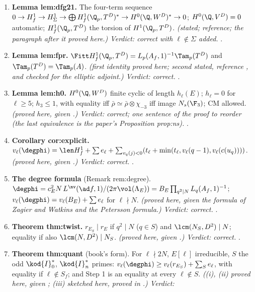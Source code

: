 \begin{sloppypar}
\begin{enumerate}[label=\textbf{\thechapter.\arabic*}]
\emph{(stated; reference; they cover $\ell=3$.)} .
\item \textbf{Lemma lem:dfg21.} The four-term sequence $0\to H^1_f\to H^1_\Sigma\to\bigoplus H^1_f(\Q_p,T^D)^*\to H^0(\Q,W^D)^*\to0$; $H^0(\Q,V^D)=0$ automatic; $H^1_f(\Q_p,T^D)$ the torsion of $H^1(\Q_p,T^D)$.
\emph{(stated; reference; the paragraph after it proved here.) Verdict: correct with $\ell\notin\Sigma$ added.} .
\item \textbf{Lemma lem:fpr.} $\Fitt H^1_f(\Q_p,T^D)=L_p(A_f,1)^{-1}\Tam_p(T^D)$ and $\Tam_p(T^D)=\Tam_p(A)$. \emph{(first identity proved here; second stated, reference \cite[(57)]{DFG04}, and checked for the
elliptic adjoint.) Verdict: correct.} .
\item \textbf{Lemma lem:h0.} $H^0(\Q,W^D)$ finite cyclic of length $h_\ell(E)$; $h_\ell=0$ for $\ell\ge5$; $h_3\le1$, with equality iff $\bar\rho\simeq\bar\rho\otimes\chi_{-3}$ iff image $N_s(\F_3)$; CM allowed.
\emph{(proved here, given .) Verdict: correct; one sentence of the proof to reorder (the last equivalence is the paper's Proposition prop:ns).} .
\item \textbf{Corollary cor:explicit.} $v_\ell(\degphi)=\len H^1_f+\sum e_\ell+\sum_{v_q(j)<0}(t_\ell+\min(t_\ell,v_\ell(q-1),v_\ell(c(u_q))))$. \emph{(proved here, given .) Verdict: correct.}
.
\item \textbf{The degree formula} (Remark rem:degree). $\degphi=c_E^2N\,L^{\nv}(\ad f,1)/(2\pi\vol(\Lambda_E))=B_E\prod_{q^2\mid N}L_q(A_f,1)^{-1}$; $v_\ell(\degphi)=v_\ell(B_E)+\sum e_\ell$ for $\ell\nmid N$.
\emph{(proved here, given the formula of Zagier and Watkins and the Petersson formula.) Verdict: correct.} .
\item \textbf{Theorem thm:twist.} $r_{E_S}\mid r_E$ if $q^2\mid N$ ($q\in S$) and $\lcm(N_S,D^2)\mid N$; equality if also $\lcm(N,D^2)\mid N_S$. \emph{(proved here, given .) Verdict: correct.}
.
\item \textbf{Theorem thm:quant} (book's form). For $\ell\nmid2N$, $E[\ell]$ irreducible, $S$ the odd $\kod{I}_0^*$, $\kod{I}_n^*$ primes: $v_\ell(\degphi)\ge v_\ell(r_{E_S})+\sum_Se_\ell$, with equality if $\ell\notin S_f$;
and Step 1 is an equality at every $\ell\notin S$. \emph{((i), (ii) proved here, given ; (iii) sketched here, proved in .) Verdict:
}
\end{enumerate}
\end{sloppypar}
